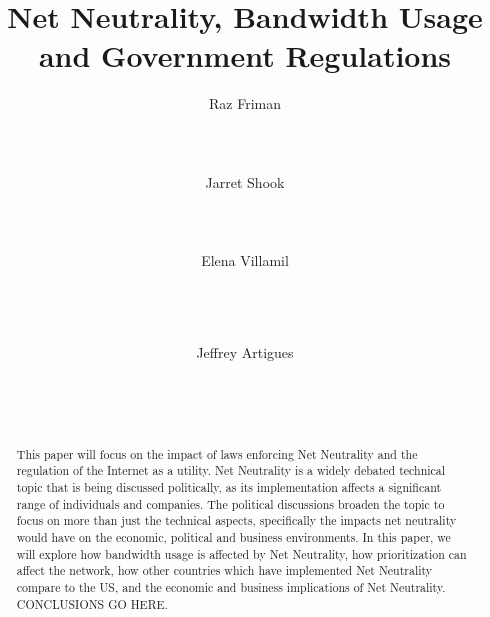 \documentclass{sigcomm-alternate}
\begin{document}
\title{Net Neutrality, Bandwidth Usage and Government Regulations}
	

\author{
	\alignauthor
	Raz Friman\\
	\\
	\\
	\\
	\alignauthor
	Jarret Shook\\
	\\
	\\
	\\
	\alignauthor Elena Villamil\\
	\\
	\\
	\\
	\and  %
	\alignauthor Jeffrey Artigues\\
	\\
	\\
	\\
}

\maketitle

\begin{abstract}
This paper will focus on the impact of laws enforcing Net Neutrality and the regulation of the Internet as a utility. Net Neutrality is a widely debated technical topic that is being discussed politically, as its implementation affects a significant range of individuals and companies.  The political discussions broaden the topic to focus on more than just the technical aspects, specifically the impacts net neutrality would have on the economic, political and business environments. In this paper, we will explore how bandwidth usage is affected by Net Neutrality, how prioritization can affect the network, how other countries which have implemented Net Neutrality compare to the US, and the economic and business implications of Net Neutrality. CONCLUSIONS GO HERE.
\end{abstract}
\end{document}

